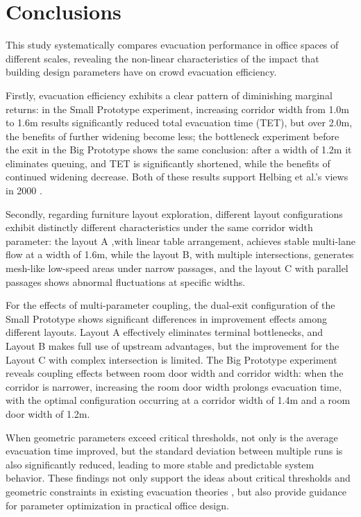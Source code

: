 \section{Conclusions}
This study systematically compares evacuation performance in office spaces of different scales, revealing the non-linear characteristics of the impact that building design parameters have on crowd evacuation efficiency.

Firstly, evacuation efficiency exhibits a clear pattern of diminishing marginal returns: in the Small Prototype experiment, increasing corridor width from 1.0m to 1.6m results significantly reduced total evacuation time (TET), but over 2.0m, the benefits of further widening become less; the bottleneck experiment before the exit in the Big Prototype shows the same conclusion: after a width of 1.2m it eliminates queuing, and TET is significantly shortened, while the benefits of continued widening decrease. Both of these results support Helbing et al.'s views in 2000 \cite{helbingSimulatingDynamicalFeatures2000}.

Secondly, regarding furniture layout exploration, different layout configurations exhibit distinctly different characteristics under the same corridor width parameter: the layout A ,with linear table arrangement, achieves stable multi-lane flow at a width of 1.6m, while the layout B, with multiple intersections, generates mesh-like low-speed areas under narrow passages, and the layout C with parallel passages shows abnormal fluctuations at specific widths.

For the effects of multi-parameter coupling, the dual-exit configuration of the Small Prototype shows significant differences in improvement effects among different layouts. Layout A effectively eliminates terminal bottlenecks, and Layout B makes full use of upstream advantages, but the improvement for the  Layout C with complex intersection is limited. The Big Prototype experiment reveals coupling effects between room door width and corridor width: when the corridor is narrower, increasing the room door width prolongs evacuation time, with the optimal configuration occurring at a corridor width of 1.4m and a room door width of 1.2m.

When geometric parameters exceed critical thresholds, not only is the average evacuation time improved, but the standard deviation between multiple runs is also significantly reduced, leading to more stable and predictable system behavior. These findings not only support the ideas about critical thresholds and geometric constraints in existing evacuation theories \cite{helbingSimulatingDynamicalFeatures2000,zhouDevelopingDatabasePedestrians2018,santosCRITICALREVIEWEMERGENCY}, but also provide guidance for parameter optimization in practical office design.


